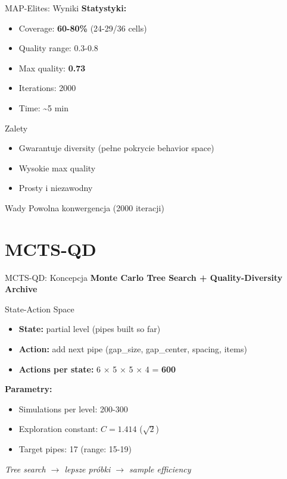 \documentclass{beamer}
\begin{document}
\begin{frame}{MAP-Elites: Wyniki}
\textbf{Statystyki:}
\begin{itemize}
\item Coverage: \textbf{60-80\%} (24-29/36 cells)
\item Quality range: 0.3-0.8
\item Max quality: \textbf{0.73}
\item Iterations: 2000
\item Time: \textasciitilde5 min
\end{itemize}

\vspace{0.5cm}
\begin{exampleblock}{Zalety}
\begin{itemize}
\item Gwarantuje diversity (pełne pokrycie behavior space)
\item Wysokie max quality
\item Prosty i niezawodny
\end{itemize}
\end{exampleblock}

\begin{alertblock}{Wady}
Powolna konwergencja (2000 iteracji)
\end{alertblock}
\end{frame}

\section{MCTS-QD}

\begin{frame}{MCTS-QD: Koncepcja}
\textbf{Monte Carlo Tree Search + Quality-Diversity Archive}

\begin{block}{State-Action Space}
\begin{itemize}
\item \textbf{State:} partial level (pipes built so far)
\item \textbf{Action:} add next pipe (gap\_size, gap\_center, spacing, items)
\item \textbf{Actions per state:} 6 × 5 × 5 × 4 = \textbf{600}
\end{itemize}
\end{block}

\textbf{Parametry:}
\begin{itemize}
\item Simulations per level: 200-300
\item Exploration constant: $C = 1.414$ ($\sqrt{2}$)
\item Target pipes: 17 (range: 15-19)
\end{itemize}

\vspace{0.3cm}
\centering
\textit{Tree search $\rightarrow$ lepsze próbki $\rightarrow$ sample efficiency}
\end{frame}
\end{document}
